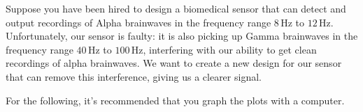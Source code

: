 


Suppose you have been hired to design a biomedical sensor that can detect and output recordings of Alpha brainwaves in the frequency range $8 \, \text{Hz}$ to $12 \, \text{Hz}$.
Unfortunately, our sensor is faulty: it is also picking up Gamma brainwaves in the frequency range $40 \, \text{Hz}$ to $100 \, \text{Hz}$, interfering with our ability to get clean recordings of alpha brainwaves.
We want to create a new design for our sensor that can remove this interference, giving us a clearer signal.

For the following, it's recommended that you graph the plots with a computer.

